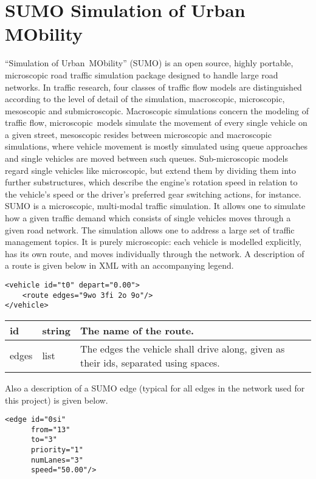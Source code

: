 \documentclass[a4paper,10pt]{article}
\begin{document}
\section{SUMO Simulation of Urban MObility}
``Simulation of Urban MObility'' (SUMO) \cite{Sim4} is an open source, highly portable, microscopic road traffic simulation package 
designed to handle large road networks. In traffic research, four classes of traffic flow models are distinguished according to the 
level of detail of the simulation, macroscopic, microscopic, mesoscopic and submicroscopic. Macroscopic simulations concern the modeling
of traffic flow, microscopic models simulate the movement of every single vehicle on a given street, mesoscopic resides between 
microscopic and macroscopic simulations, where vehicle movement is mostly simulated using queue approaches and single vehicles are moved
between such queues. Sub-microscopic models regard single vehicles like microscopic, but extend them by dividing them into further 
substructures, which describe the engine's rotation speed in relation to the vehicle's speed or the driver's preferred gear switching 
actions, for instance. SUMO is a microscopic, multi-modal traffic simulation. It allows one to simulate how a given traffic demand which
consists of single vehicles moves through a given road network. The simulation allows one to address a large set of traffic management 
topics. It is purely microscopic: each vehicle is modelled explicitly, has its own route, and moves individually through the network. 
A description of a route is given below in XML with an accompanying legend.


\begin{lstlisting}
<vehicle id="t0" depart="0.00">
    <route edges="9wo 3fi 2o 9o"/>
</vehicle>
\end{lstlisting}

\begin{center}
    \begin{tabular}{| l | l | p{10cm} |}
    \hline
    id & string & The name of the route. \\ \hline
    edges & list & The edges the vehicle shall drive along, given as their ids, separated using spaces. \\ \hline
    \end{tabular}
\end{center}

Also a description of a SUMO edge (typical for all edges in the network used for this project) is given below.

\begin{lstlisting}
<edge id="0si" 
      from="13" 
      to="3" 
      priority="1" 
      numLanes="3" 
      speed="50.00"/>
\end{lstlisting}
\end{document}
